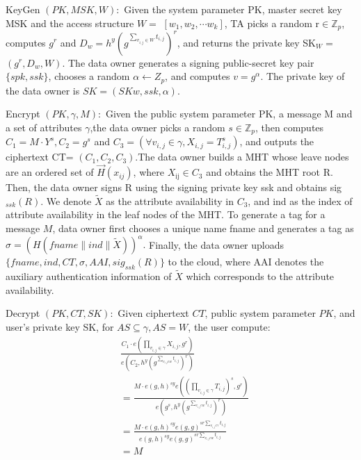 \documentclass[runningheads]{llncs}
\begin{document}
KeyGen $(PK,MSK,W){:}$ Given the system parameter PK, master secret key MSK and the access structure $W=$ $[w_1,w_2,\cdots w_k]$, TA picks a random r$\in\mathbb{Z}_p$, computes $g^r$ and $D_w=h^y(g^{\sum_{v_{i,j}\in W}t_{i,j}})^r$, and returns the private key SK$_W=$ $(g^r,D_w,W).$ The data owner generates a signing public-secret key pair $\{spk, ssk\}$, chooses a random $\alpha\leftarrow Z_p$, and computes $v=g^{\alpha}.$ The private key of the data owner is $SK=(SKw,ssk,\alpha)$.

Encrypt $(PK,\gamma,M){:}$ Given the public system parameter PK, a message M and a set of attributes $\gamma$,the data owner picks a random $s\in\mathbb{Z}_p$, then computes $C_1=M\cdot Y^s,C_2=g^s$ and $C_3=(\forall v_{i,j}\in\gamma,X_{i,j}=T_{i,j}^s)$, and outputs the ciphertext CT= $(C_{1},C_{2},C_{3}).$The data owner builds a MHT whose leave nodes are an ordered set of $\vec{H}(x_{ij})$, where $X_\mathrm{ij}\in C_3$ and obtains the MHT root R. Then, the data owner signs R using the signing private key ssk and obtains sig$_{ssk}(R).$ We denote $\tilde{X}$ as the attribute availability in $C_3$, and ind as the index of attribute availability in the leaf nodes of the MHT. To generate a tag for a message $M$, data owner first chooses a unique name fname and generates a tag as $\sigma=(H(fname\parallel ind\parallel\tilde{X}))^\alpha.$ Finally, the data owner uploads $\{fname,ind,CT,\sigma,AAI,sig_{ssk}(R)\}$ to the cloud, where AAI denotes the auxiliary authentication information of $\tilde{X}$ which corresponds to the attribute availability.

Decrypt $(PK,CT,SK){:}$ Given ciphertext $CT$, public system parameter $PK$, and user's private key SK, for $AS\subseteq\gamma,AS=W$, the user compute:
$$\begin{aligned}&\frac{C_{1}\cdot e(\prod_{v_{i,j}\in\gamma}X_{i,j},g^{r})}{e(C_{2},h^{y}(g^{\sum_{v_{i,j}ew}t_{i,j}})^{r})}\\&=\frac{M\cdot e(g,h)^{sy}e((\prod_{v_{i,j}\in\gamma}T_{i,j})^{s},g^{r})}{e(g^{s},h^{y}(g^{\sum_{v_{i,j}ew}t_{i,j}})^{r})}\\&=\frac{M\cdot e(g,h)^{sy}e(g,g)^{sr\sum_{v_{i,j}e\gamma}t_{i,j}}}{e(g,h)^{sy}e(g,g)^{sr\sum_{v_{i,j}ew}t_{i,j}}}\\&=M\end{aligned}$$
\end{document}
